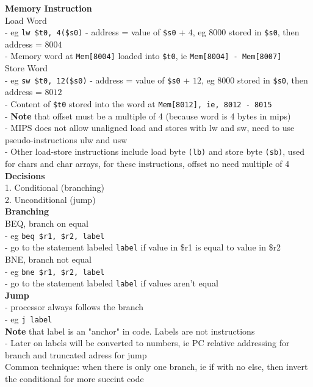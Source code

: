 \documentclass[10pt, a4paper]{article}
\newcommand{\highlight}[1]{{\color{red}\textbf{#1}}}
\begin{document}
\begin{multicols*}{3}
		\textbf{Memory Instruction}\\
		Load Word\\
		- eg \texttt{lw \$t0, 4(\$s0)}
		- address = value of \texttt{\$s0} + $4$, eg $8000$ stored in \texttt{\$s0}, then address = $8004$\\
		- Memory word at \texttt{Mem[8004]} loaded into \texttt{\$t0}, ie \texttt{Mem[8004] - Mem[8007]}\\
		Store Word\\
		- eg \texttt{sw \$t0, 12(\$s0)}
		- address = value of \texttt{\$s0} + $12$, eg $8000$ stored in \texttt{\$s0}, then address = $8012$\\
		- Content of \texttt{\$t0} stored into the word at \texttt{Mem[8012], ie, 8012 - 8015}\\
		
		- \highlight{Note} that offset must be a multiple of 4 (because word is 4 bytes in mips)\\
		- MIPS does not allow unaligned load and stores with lw and sw, need to use pseudo-instructions ulw and usw\\
		- Other load-store instructions include load byte \texttt{(lb)} and store byte \texttt{(sb)}, used for chars and char arrays, for these instructions, offset no need multiple of 4\\
		  
		\textbf{Decisions}\\
		1. Conditional (branching)\\
		2. Unconditional (jump)\\
		
		\textbf{Branching}\\
		BEQ, branch on equal\\
		- eg \texttt{beq \$r1, \$r2, label}\\
		- go to the statement labeled \texttt{label} if value in \$r1 is equal to value in \$r2\\
		BNE, branch not equal\\
		- eg \texttt{bne \$r1, \$r2, label}\\
		- go to the statement labeled \texttt{label} if values aren't equal\\
		
		\textbf{Jump}\\
		- processor always follows the branch\\
		- eg \texttt{j label}\\
		
		\highlight{Note} that label is an "anchor" in code. Labels are not instructions\\
		- Later on labels will be converted to numbers, ie PC relative addressing for branch and truncated adress for jump\\
		Common technique: when there is only one branch, ie if with no else, then invert the conditional for more succint code\\
		

\end{multicols*}
\end{document}
